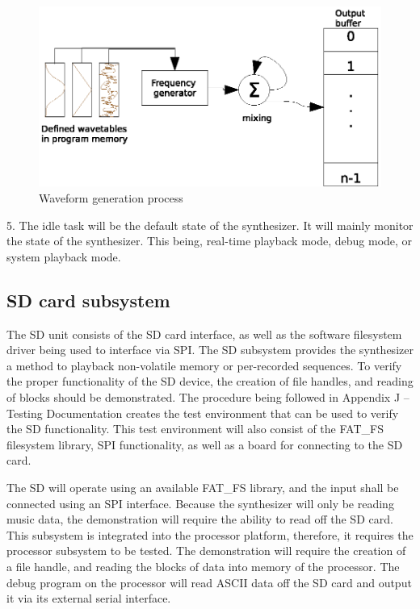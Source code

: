\documentclass[bibtotocnumbered,abstract=on,paper=a4,fontsize=12pt,parskip=on,halfparskip=on]{scrartcl}		%
\begin{document}
  \begin{figure}[h!]
    \centering
      \includegraphics[]{img/fig_synthesis}
      \caption{Waveform generation process}
  \end{figure}

  5. The idle task will be the default state of the synthesizer. It will mainly monitor the state of the synthesizer. This being, real-time playback mode, debug mode, or system playback mode.
  \subsection{SD card subsystem}

   The SD unit consists of the SD card interface, as well as the software filesystem driver being used to interface via SPI. The SD subsystem provides the synthesizer a method to playback non-volatile memory or per-recorded sequences. To verify the proper functionality of the SD device, the creation of file handles, and reading of blocks should be demonstrated. The procedure being followed in Appendix J – Testing Documentation creates the test environment that can be used to verify the SD functionality. This test environment will also consist of the FAT\_FS filesystem library, SPI functionality, as well as a board for connecting to the SD card. 

    The SD will operate using an available FAT\_FS \cite{website:fatfsnotes} library, and the input shall be connected using an SPI  interface. Because the synthesizer will only be reading music data, the demonstration will require the ability to read off the SD card. This subsystem is integrated into the processor platform, therefore, it requires the processor subsystem to be tested. The demonstration will require the creation of a file handle, and reading the blocks of data into memory of the processor. The debug program on the processor will read ASCII data off the SD card and output it via its external serial interface.\\
\end{document}
